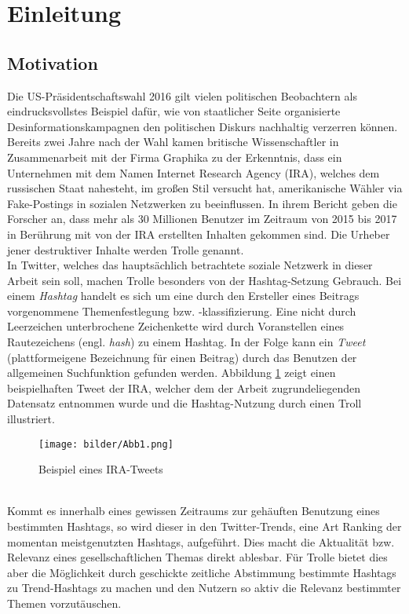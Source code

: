 \section{Einleitung}\raggedbottom
\subsection{Motivation}
Die US-Präsidentschaftswahl 2016 gilt vielen politischen Beobachtern als eindrucksvollstes Beispiel dafür, wie von staatlicher Seite organisierte Desinformationskampagnen den politischen Diskurs nachhaltig verzerren können. Bereits zwei Jahre nach der Wahl kamen britische Wissenschaftler in Zusammenarbeit mit der Firma Graphika zu der Erkenntnis, dass ein Unternehmen mit dem Namen \glqq Internet Research Agency\grqq{}	(IRA), welches dem russischen Staat nahesteht, im großen Stil versucht hat, amerikanische Wähler via Fake-Postings in sozialen Netzwerken zu beeinflussen. In ihrem Bericht geben die Forscher an, dass mehr als 30 Millionen Benutzer im Zeitraum von 2015 bis 2017 in Berührung mit von der IRA erstellten Inhalten gekommen sind. Die Urheber jener destruktiver Inhalte werden Trolle genannt. \citep{IRAOxf18}\\
In Twitter, welches das hauptsächlich betrachtete soziale Netzwerk in dieser Arbeit sein soll, machen Trolle besonders von der Hashtag-Setzung Gebrauch. Bei einem \textit{Hashtag} handelt es sich um eine durch den Ersteller eines Beitrags vorgenommene Themenfestlegung bzw. -klassifizierung. Eine nicht durch Leerzeichen unterbrochene Zeichenkette wird durch Voranstellen eines Rautezeichens (engl. \textit{hash}) zu einem Hashtag. In der Folge kann ein \textit{Tweet} (plattformeigene Bezeichnung für einen Beitrag) durch das Benutzen der allgemeinen Suchfunktion gefunden werden. Abbildung \ref{tweetex} zeigt einen beispielhaften Tweet der IRA, welcher dem der Arbeit zugrundeliegenden Datensatz entnommen wurde und die Hashtag-Nutzung durch einen Troll illustriert.
\begin{figure}[htb]
	\begin{center}
		\texttt{[image: bilder/Abb1.png]}
		\caption{Beispiel eines IRA-Tweets}\label{tweetex}
	\end{center}
\end{figure}\\
Kommt es innerhalb eines gewissen Zeitraums zur gehäuften Benutzung eines bestimmten Hashtags, so wird dieser in den \glqq Twitter-Trends\grqq, eine Art Ranking der momentan meistgenutzten Hashtags, aufgeführt. Dies macht die Aktualität bzw. Relevanz eines gesellschaftlichen Themas direkt ablesbar. Für Trolle bietet dies aber die Möglichkeit durch geschickte zeitliche Abstimmung bestimmte Hashtags zu Trend-Hashtags zu machen und den Nutzern so aktiv die Relevanz bestimmter Themen vorzutäuschen.\\
